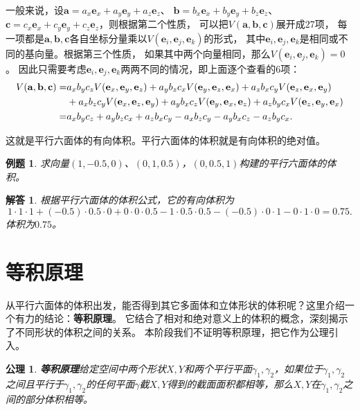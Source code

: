 \documentclass[12pt,UTF8]{ctexbook}
\newtheorem{et}{例题}[section]
\newtheorem{po}{公理}
\newtheorem*{so}{解答}
\begin{document}
一般来说，设$\mathbf{a} = a_x\mathbf{e}_x + a_y\mathbf{e}_y + a_z\mathbf{e}_z$、
$\mathbf{b} = b_x\mathbf{e}_x + b_y\mathbf{e}_y + b_z\mathbf{e}_z$、
$\mathbf{c} = c_x\mathbf{e}_x + c_y\mathbf{e}_y + c_z\mathbf{e}_z$，则根据第二个性质，
可以把$V(\mathbf{a},\mathbf{b},\mathbf{c})$展开成$27$项，
每一项都是$\mathbf{a},\mathbf{b},\mathbf{c}$各自坐标分量乘以$V(\mathbf{e}_i, \mathbf{e}_j, \mathbf{e}_k)$的形式，
其中$\mathbf{e}_i, \mathbf{e}_j, \mathbf{e}_k$是相同或不同的基向量。根据第三个性质，
如果其中两个向量相同，那么$V(\mathbf{e}_i, \mathbf{e}_j, \mathbf{e}_k)=0$。
因此只需要考虑$\mathbf{e}_i, \mathbf{e}_j, \mathbf{e}_k$两两不同的情况，即上面逐个查看的$6$项：
\begin{align}
    V(\mathbf{a},\mathbf{b},\mathbf{c}) = & a_xb_yc_zV(\mathbf{e}_x, \mathbf{e}_y, \mathbf{e}_z) + a_yb_zc_xV(\mathbf{e}_y, \mathbf{e}_z, \mathbf{e}_x) + a_zb_xc_yV(\mathbf{e}_z, \mathbf{e}_x, \mathbf{e}_y) \notag\\ 
    &+ a_xb_zc_yV(\mathbf{e}_x, \mathbf{e}_z, \mathbf{e}_y) + a_yb_xc_zV(\mathbf{e}_y, \mathbf{e}_x, \mathbf{e}_z) + a_zb_yc_xV(\mathbf{e}_z, \mathbf{e}_y, \mathbf{e}_x) \notag\\
    = & a_xb_yc_z + a_yb_zc_x + a_zb_xc_y - a_xb_zc_y - a_yb_xc_z - a_zb_yc_x. \notag
\end{align}

这就是平行六面体的有向体积。平行六面体的体积就是有向体积的绝对值。
\begin{et}
    求向量$(1,-0.5,0)$、$(0,1,0.5)$，$(0,0.5,1)$构建的平行六面体的体积。
\end{et}
\begin{so}
    根据平行六面体的体积公式，它的有向体积为
    $$ 1\cdot 1\cdot 1 + (-0.5)\cdot 0.5\cdot 0 + 0\cdot 0\cdot 0.5 - 1\cdot 0.5\cdot 0.5 - (-0.5)\cdot 0\cdot 1 - 0\cdot 1\cdot 0 = 0.75.$$
    体积为$0.75$。
\end{so}

\section{等积原理}

从平行六面体的体积出发，能否得到其它多面体和立体形状的体积呢？这里介绍一个有力的结论：\textbf{等积原理}。
它结合了相对和绝对意义上的体积的概念，深刻揭示了不同形状的体积之间的关系。
本阶段我们不证明等积原理，把它作为公理引入。
\begin{po}{\textbf{等积原理}}\label{po:6}
    给定空间中两个形状$X,Y$和两个平行平面$\gamma_1,\gamma_2$，如果位于$\gamma_1,\gamma_2$之间且平行于$\gamma_1,\gamma_2$的任何平面$\gamma$截$X,Y$得到的截面面积都相等，那么$X,Y$在$\gamma_1,\gamma_2$之间的部分体积相等。
\end{po}
\end{document}
